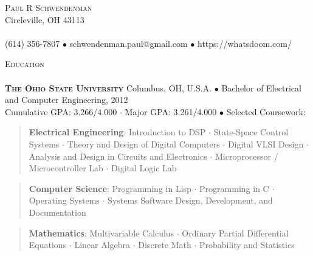 \documentclass{article}
\newcommand{\area}[2]{\vspace*{-9pt} \begin{verse}\textbf{#1}:   #2 \end{verse}  }
\newcommand{\lineunder}{\vspace*{-8pt} \\ \hspace*{-18pt} \hrulefill{} \\}
\newcommand{\header}[1]{{\hspace*{-15pt}\vspace*{6pt} \textsc{#1}} \vspace*{-6pt} \lineunder}
\newcommand{\contact}[3]{
\vspace*{-8pt}
\begin{center}
{\LARGE \scshape {#1}}\\
#2 \lineunder{}
#3
\end{center}
\vspace*{-8pt}
}
\newcommand{\schoolwithcourses}[4]{
 \textbf{#1} #2 $\bullet$ #3\\
#4 $\bullet$  Selected Coursework:\\
\vspace*{5pt}
}
\begin{document}
\small
\smallskip
\vspace*{-44pt}

\contact{Paul R Schwendenman}
{Circleville, OH 43113}
{(614) 356-7807 $\bullet$ schwendenman.paul@gmail.com  $\bullet$ https://whatsdoom.com/}

\header{Education}

\schoolwithcourses{\textsc{The Ohio State University}}{Columbus, OH, U.S.A.}{Bachelor of Electrical and Computer Engineering, 2012}
{Cumulative GPA: 3.266/4.000 $\cdot$ Major GPA: 3.261/4.000}
	\area{Electrical Engineering}{Introduction to DSP $\cdot$ State-Space Control Systems $\cdot$ Theory and Design of Digital Computers $\cdot$
		Digital VLSI Design $\cdot$ Analysis and Design in Circuits and Electronics $\cdot$ Microprocessor / Microcontroller Lab $\cdot$ Digital Logic Lab}
	\area{Computer Science}{Programming in Lisp $\cdot$ Programming in C
		$\cdot$ Operating Systems $\cdot$ Systems Software Design, Development, and Documentation}
	\area{Mathematics}{Multivariable Calculus $\cdot$ Ordinary Partial Differential Equations $\cdot$ Linear Algebra $\cdot$ Discrete Math $\cdot$
		Probability and Statistics}

\end{document}
